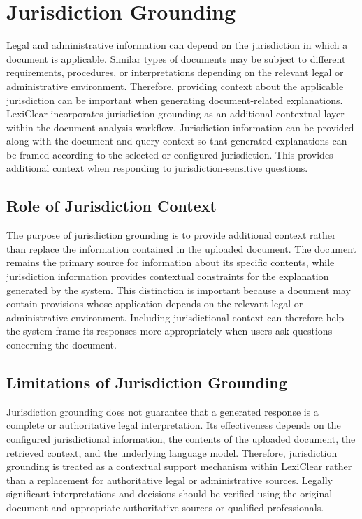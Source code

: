\documentclass[12pt,a4paper,oneside]{report}
\begin{document}
\section{Jurisdiction Grounding}

Legal and administrative information can depend on the jurisdiction in which
a document is applicable. Similar types of documents may be subject to
different requirements, procedures, or interpretations depending on the
relevant legal or administrative environment. Therefore, providing context
about the applicable jurisdiction can be important when generating
document-related explanations. LexiClear incorporates jurisdiction grounding as an additional contextual
layer within the document-analysis workflow. Jurisdiction information can be
provided along with the document and query context so that generated
explanations can be framed according to the selected or configured
jurisdiction. This provides additional context when responding to
jurisdiction-sensitive questions.

\subsection{Role of Jurisdiction Context}

The purpose of jurisdiction grounding is to provide additional context rather
than replace the information contained in the uploaded document. The
document remains the primary source for information about its specific
contents, while jurisdiction information provides contextual constraints for
the explanation generated by the system. This distinction is important because a document may contain provisions whose
application depends on the relevant legal or administrative environment.
Including jurisdictional context can therefore help the system frame its
responses more appropriately when users ask questions concerning the
document.

\subsection{Limitations of Jurisdiction Grounding}

Jurisdiction grounding does not guarantee that a generated response is a
complete or authoritative legal interpretation. Its effectiveness depends on
the configured jurisdictional information, the contents of the uploaded
document, the retrieved context, and the underlying language model. Therefore, jurisdiction grounding is treated as a contextual support
mechanism within LexiClear rather than a replacement for authoritative legal
or administrative sources. Legally significant interpretations and decisions
should be verified using the original document and appropriate authoritative
sources or qualified professionals.
\end{document}
